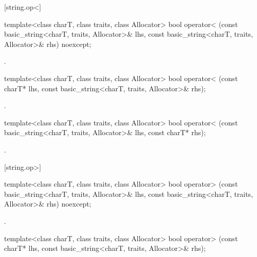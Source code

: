 [string.op<]{}

%
\begin{itemdecl}
template<class charT, class traits, class Allocator>
  bool operator< (const basic_string<charT, traits, Allocator>& lhs,
                  const basic_string<charT, traits, Allocator>& rhs) noexcept;
\end{itemdecl}

\begin{itemdescr}
\pnum
\returns
{}.
\end{itemdescr}

%
\begin{itemdecl}
template<class charT, class traits, class Allocator>
  bool operator< (const charT* lhs,
                  const basic_string<charT, traits, Allocator>& rhs);
\end{itemdecl}

\begin{itemdescr}
\pnum
\returns
{}.
\end{itemdescr}

%
\begin{itemdecl}
template<class charT, class traits, class Allocator>
  bool operator< (const basic_string<charT, traits, Allocator>& lhs,
                  const charT* rhs);
\end{itemdecl}

\begin{itemdescr}
\pnum
\returns
{}.
\end{itemdescr}

[string.op>]{}

%
\begin{itemdecl}
template<class charT, class traits, class Allocator>
  bool operator> (const basic_string<charT, traits, Allocator>& lhs,
                  const basic_string<charT, traits, Allocator>& rhs) noexcept;
\end{itemdecl}

\begin{itemdescr}
\pnum
\returns
{}.
\end{itemdescr}

%
\begin{itemdecl}
template<class charT, class traits, class Allocator>
  bool operator> (const charT* lhs,
                  const basic_string<charT, traits, Allocator>& rhs);
\end{itemdecl}

